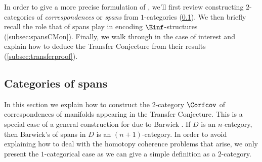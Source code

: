 In order to give a more precise formulation of , we'll first review constructing $ 2 $-categories of \textit{correspondences} or \textit{spans} from $ 1 $-categories (\cref{subsec:spans}). 
We then briefly recall the role that \categories of spans play in encoding $ \Einf $-structures (\cref{subsec:spansCMon}).
Finally, we walk through \cite[Appendix C]{MotivicNorms:BachmannHoyois} in the case of interest and explain how to deduce the Transfer Conjecture from their results (\cref{subsec:transferproof}).  


\subsection{Categories of spans}\label{subsec:spans}

In this section we explain how to construct the $ 2 $-category $ \Corfcov $ of correspondences of manifolds appearing in the Transfer Conjecture.
This is a special case of a general construction for \categories due to Barwick \cite[§§3--5]{MR3558219}.
If $ D $ is an $ n $-category, then Barwick's \category of spans in $ D $ is an $ (n+1) $-category. 
In order to avoid explaining how to deal with the homotopy coherence problems that arise, we only present the $ 1 $-categorical case as we can give a simple definition as a $ 2 $-category.

